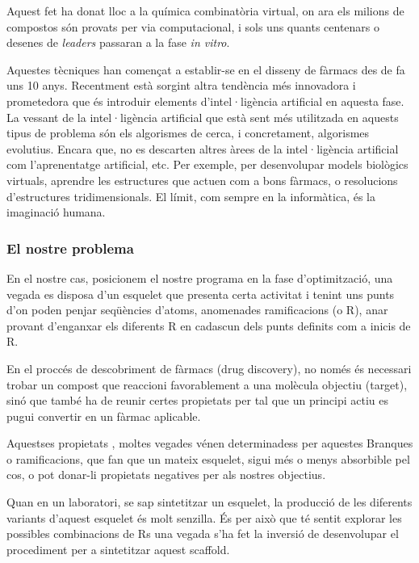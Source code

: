 \documentclass[titlepage,a4paper,12pt]{book}
\begin{document}
	Aquest fet ha donat lloc a la química combinatòria virtual, on ara els
	milions de compostos són provats per via computacional, i sols uns quants
	centenars o desenes de \emph{leaders} passaran a la fase \emph{in vitro}.

	Aquestes tècniques han començat a establir-se en el disseny de fàrmacs des
	de fa uns 10 anys. Recentment està sorgint altra tendència més innovadora i
	prometedora que és introduir elements d'intel·ligència artificial en aquesta
	fase. La vessant de la intel·ligència artificial que està sent més
	utilitzada en aquests tipus de problema són els algorismes de cerca, i
	concretament, algorismes evolutius. Encara que, no es descarten altres àrees
	de la intel·ligència artificial com l'aprenentatge artificial, etc.  Per
	exemple, per desenvolupar models biològics virtuals, aprendre les
	estructures que actuen com a bons fàrmacs, o resolucions d'estructures
	tridimensionals. El límit, com sempre en la informàtica, és la imaginació
	humana.

\subsubsection{El nostre problema} %

	En el nostre cas, posicionem el nostre programa en la fase d'optimització,
	una vegada es disposa d'un esquelet que presenta certa activitat i tenint
	uns punts d'on poden penjar seqüències d'atoms, anomenades ramificacions (o
	R), anar provant d'enganxar els diferents R en cadascun dels punts definits
	com a inicis de R.

	En el proccés de descobriment de fàrmacs (drug discovery), no només és
	necessari trobar un compost que reaccioni favorablement a una molècula
	objectiu (target), sinó que també ha de reunir certes propietats per tal que
	un principi actiu es pugui convertir en un fàrmac aplicable.  	

	Aquestses propietats , moltes vegades vénen determinadess per aquestes
	Branques o ramificacions, que fan que un mateix esquelet, sigui més o menys
	absorbible pel cos, o pot donar-li propietats negatives per als nostres
	objectius.

	Quan en un laboratori, se sap sintetitzar un esquelet, la producció de les
	diferents variants d'aquest esquelet és molt senzilla.  És per això que té
	sentit explorar les possibles combinacions de Rs una vegada s'ha fet la
	inversió de desenvolupar el procediment per a sintetitzar aquest scaffold.
\end{document}
